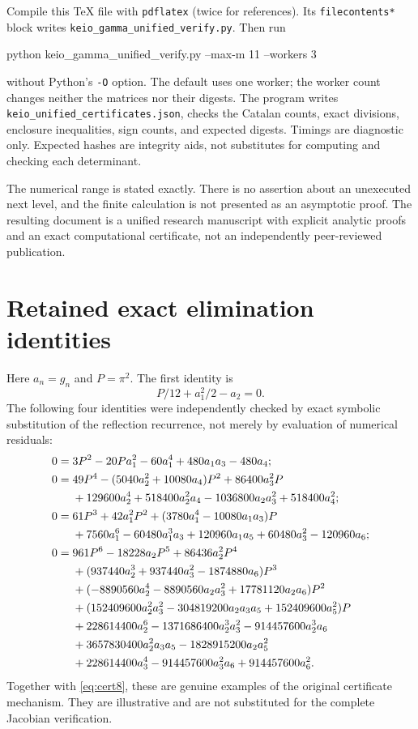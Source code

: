 \documentclass[11pt,a4paper]{article}
\theoremstyle{definition}\newtheorem{definition}[theorem]{Definition}
\theoremstyle{remark}\newtheorem{remark}[theorem]{Remark}
\begin{document}
Compile this TeX file with \texttt{pdflatex} (twice for references). Its \texttt{filecontents*} block writes \texttt{keio\_gamma\_unified\_verify.py}. Then run
\begin{center}\ttfamily\small
python keio\_gamma\_unified\_verify.py --max-m 11 --workers 3
\end{center}
without Python's \texttt{-O} option. The default uses one worker; the worker count changes neither the matrices nor their digests. The program writes \texttt{keio\_unified\_certificates.json}, checks the Catalan counts, exact divisions, enclosure inequalities, sign counts, and expected digests. Timings are diagnostic only. Expected hashes are integrity aids, not substitutes for computing and checking each determinant.

The numerical range is stated exactly. There is no assertion about an unexecuted next level, and the finite calculation is not presented as an asymptotic proof. The resulting document is a unified research manuscript with explicit analytic proofs and an exact computational certificate, not an independently peer-reviewed publication.

\appendix
\section{Retained exact elimination identities}\label{app:certs}
Here $a_n=g_n$ and $P=\pi^2$. The first identity is
\[
P/12+a_1^2/2-a_2=0.
\]
The following four identities were independently checked by exact symbolic substitution of the reflection recurrence, not merely by evaluation of numerical residuals:
\begin{align}
0={}&3P^2-20Pa_1^2-60a_1^4+480a_1a_3-480a_4;\label{eq:a134}\\
0={}&49P^4-(5040a_2^2+10080a_4)P^2+86400a_3^2P\notag\\
 &+129600a_2^4+518400a_2^2a_4-1036800a_2a_3^2+518400a_4^2;\label{eq:a234}\\
0={}&61P^3+42a_1^2P^2+(3780a_1^4-10080a_1a_3)P\notag\\
 &+7560a_1^6-60480a_1^3a_3+120960a_1a_5
 +60480a_3^2-120960a_6;\label{eq:a1356}\\
0={}&961P^6-18228a_2P^5+86436a_2^2P^4\notag\\
 &+(937440a_2^3+937440a_3^2-1874880a_6)P^3\notag\\
 &+(-8890560a_2^4-8890560a_2a_3^2+17781120a_2a_6)P^2\notag\\
 &+(152409600a_2^2a_3^2-304819200a_2a_3a_5+152409600a_5^2)P\notag\\
 &+228614400a_2^6-1371686400a_2^3a_3^2-914457600a_2^3a_6\notag\\
 &+3657830400a_2^2a_3a_5-1828915200a_2a_5^2\notag\\
 &+228614400a_3^4-914457600a_3^2a_6+914457600a_6^2.\label{eq:a2356}
\end{align}
Together with \eqref{eq:cert8}, these are genuine examples of the original certificate mechanism. They are illustrative and are not substituted for the complete Jacobian verification.
\end{document}
